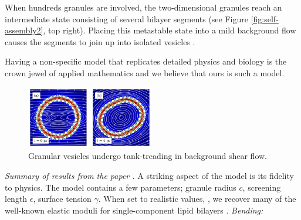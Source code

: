 When hundreds granules are involved,
the two-dimensional granules reach an intermediate
state consisting of several bilayer segments (see Figure \ref{fig:self-assembly2}, top right).
Placing this metastable state into a mild background flow
causes the segments to join up into isolated vesicles \cite{fu-ryh-qua-you2022}.

Having a non-specific model that replicates detailed
physics and biology is the crown jewel of applied mathematics
and we believe that ours is such a model. 

\begin{figure}
\includegraphics[width=0.5\textwidth]{figures/PreliminaryWork/TankTreading.jpg}
\caption{\label{fig:JPv_linearshear}Granular vesicles undergo
tank-treading in background shear flow.}
\end{figure}
\textit{Summary of results from the paper \cite{Fu2018_SIAM}.}
A striking aspect of the
model is its fidelity to physics.
The model contains a few
parameters; granule radius $c$,
screening length $\epsilon$,
surface tension $\gamma$.
When set to realistic values,
\cite{Fu2018_SIAM, ErLjCl89, Lin2005, Parsegian, Israelachvili80, GarciaSaez, KUZMIN2005, Petelska2012,Jackson2016},
we recover many of the well-known
elastic moduli for single-component lipid bilayers
\cite{Nagle17, Nagle17-2, LeVeWa14,NAGLE2000159}.
\emph{Bending:}


